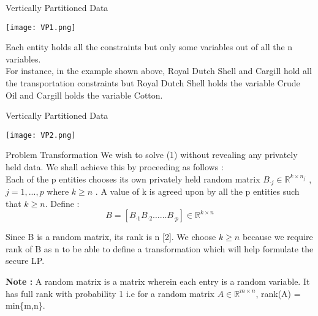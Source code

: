 \documentclass[9pt]{beamer}
\begin{document}
\begin{frame}{Vertically Partitioned Data}
\begin{center}
   \texttt{[image: VP1.png]}\\ 
\end{center}
Each entity holds all the constraints but only some variables out of all the n variables. \\

\vspace{0.1cm}
For instance, in the example shown above, Royal Dutch Shell and Cargill hold all the transportation constraints but Royal Dutch Shell holds the variable Crude Oil and Cargill holds the variable Cotton. 
\end{frame}

\begin{frame}{Vertically Partitioned Data}
\begin{center}
   \texttt{[image: VP2.png]}
\end{center}
\end{frame}

\begin{frame}{Problem Transformation}
We wish to solve (1) without revealing any privately held data. We shall achieve this by proceeding as follows :\\

\vspace{0.1cm}
Each of the p entities chooses its own privately held random matrix $ {B}_{\cdot j} \in \mathbb{R}^{k \times n_{j}} $ , $ j = 1,...,p $ where $ k \geq n $ . A value of k is agreed upon by all the p entities such that $ k \geq n $. Define :\\
\begin{equation}
B=\left[B_{\cdot 1} B_{\cdot 2} \ldots \ldots B_{\cdot p}\right] \in \mathbb{R}^{k \times n}
\end{equation}
\vspace{0.1cm}

Since B is a random matrix, its rank is n [2]. We choose $ k \geq n $ because we require rank of B as n to be able to define a transformation which will help formulate the secure LP. \\
\vspace{0.1cm}

\textbf{Note :} A random matrix is a matrix wherein each entry is a random variable. It has full rank with probability 1 i.e for a random matrix $ A \in \mathbb{R}^{m \times n} $, rank(A) = min\{m,n\}. 
\end{frame}
\end{document}
